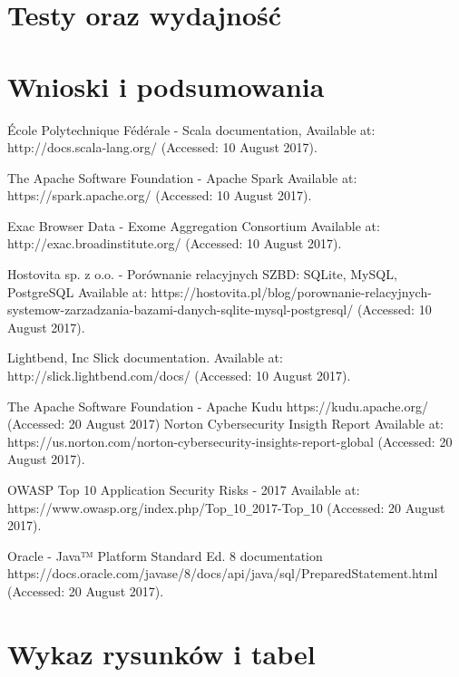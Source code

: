 \documentclass[a4paper,12pt,twoside]{article}
\begin{document}
\newpage
\section{Testy oraz wydajność}  
\newpage
\section{Wnioski i podsumowania}  

\newpage
\begin{thebibliography}{99}

École Polytechnique Fédérale - Scala documentation,
Available at: http://docs.scala-lang.org/ (Accessed: 10 August 2017).

The Apache Software Foundation - Apache Spark Available at: https://spark.apache.org/ (Accessed: 10 August 2017).

Exac Browser Data - Exome Aggregation Consortium  
Available at: http://exac.broadinstitute.org/ (Accessed: 10 August 2017).

Hostovita sp. z o.o. - Porównanie relacyjnych SZBD: SQLite, MySQL, PostgreSQL
Available at:
https://hostovita.pl/blog/porownanie-relacyjnych-systemow-zarzadzania-bazami-danych-sqlite-mysql-postgresql/ (Accessed: 10 August 2017).

Lightbend, Inc Slick documentation. Available at:
http://slick.lightbend.com/docs/ (Accessed: 10 August 2017).

The Apache Software Foundation - Apache Kudu
https://kudu.apache.org/ (Accessed: 20 August 2017)
Norton Cybersecurity Insigth Report 
Available at: https://us.norton.com/norton-cybersecurity-insights-report-global (Accessed: 20 August 2017).

OWASP Top 10 Application Security Risks - 2017 Available at: 
https://www.owasp.org/index.php/Top\verb!_!10\verb!_!2017-Top\verb!_!10 (Accessed: 20 August 2017).

Oracle - Java™ Platform Standard Ed. 8 documentation
https://docs.oracle.com/javase/8/docs/api/java/sql/PreparedStatement.html (Accessed: 20 August 2017).

\end{thebibliography}

\newpage
\section*{Wykaz rysunków i tabel} 
\end{document}
